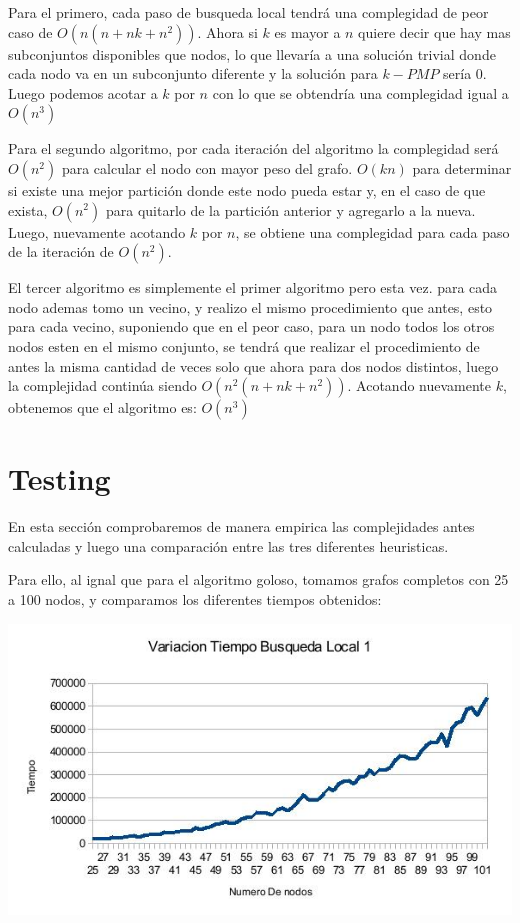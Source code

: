 Para el primero, cada paso de busqueda local tendrá una complegidad de peor caso de $O(n(n + n k + n^2))$. Ahora si $k$ es mayor a $n$ quiere decir que hay mas subconjuntos disponibles que nodos, lo que llevaría a una solución trivial donde cada nodo va en un subconjunto diferente y la solución para $k-PMP$ sería 0.
Luego podemos acotar a $k$ por $n$ con lo que se obtendría una complegidad igual a $O(n^3)$

Para el segundo algoritmo, por cada iteración del algoritmo la complegidad será $O(n^2)$ para calcular el nodo con mayor peso del grafo. $O(k n)$ para determinar si existe una mejor partición donde este nodo pueda estar y, en el caso de que exista, $O(n^2)$ para quitarlo de la partición anterior y agregarlo a la nueva. Luego, nuevamente acotando $k$ por $n$, se obtiene una complegidad para cada paso de la iteración de $O(n^2)$.

El tercer algoritmo es simplemente el primer algoritmo pero esta vez. para cada nodo ademas tomo un vecino, y realizo el mismo procedimiento que antes, esto para cada vecino, suponiendo que en el peor caso, para un nodo todos los otros nodos esten en el mismo conjunto, se tendrá que realizar el procedimiento de antes la misma cantidad de veces solo que ahora para dos nodos distintos, luego la complejidad continúa siendo $O(n^2 (n + n k + n^2))$. Acotando nuevamente $k$, obtenemos que el algoritmo es: $O(n^3)$

\section{Testing}

En esta sección comprobaremos de manera empirica las complejidades antes calculadas y luego una comparación entre las tres diferentes heuristicas.

Para ello, al ignal que para el algoritmo goloso, tomamos grafos completos con 25 a 100 nodos, y comparamos los diferentes tiempos obtenidos:

\includegraphics[scale=0.5]{Ej4/tiempo1.jpg}

